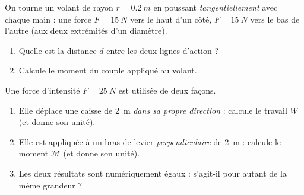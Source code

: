 \documentclass[11pt,a4paper]{article}
\begin{document}
\begin{exo}[le volant]
On tourne un volant de rayon $r=\qty{0.2}{m}$ en poussant \emph{tangentiellement} avec chaque main :
une force $F=\qty{15}{N}$ vers le haut d'un côté, $F=\qty{15}{N}$ vers le bas de l'autre (aux deux
extrémités d'un diamètre).
\begin{enumerate}[label=\alph*)]
  \item Quelle est la distance $d$ entre les deux lignes d'action ?
  \item Calcule le moment du couple appliqué au volant.
\end{enumerate}
\end{exo}

\begin{exo}
Une force d'intensité $F=\qty{25}{N}$ est utilisée de deux façons.
\begin{enumerate}[label=\alph*)]
  \item Elle déplace une caisse de \qty{2}{m} \emph{dans sa propre direction} : calcule le travail $W$
        (et donne son unité).
  \item Elle est appliquée à un bras de levier \emph{perpendiculaire} de \qty{2}{m} : calcule le moment
        $\mathcal{M}$ (et donne son unité).
  \item Les deux résultats sont numériquement égaux : s'agit-il pour autant de la même grandeur ?
\end{enumerate}
\end{exo}
\end{document}
